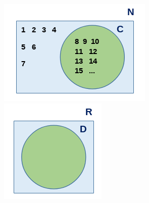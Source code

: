 \documentclass[12pt]{article}
\begin{document}
\begin{enumerate}
\begin{figure}[h!]
\begin{minipage}[b]{0.23\textwidth}
                        \end{minipage}
                        \hfill
                        \begin{minipage}[b]{0.26\textwidth}
                            \centering
                            \includegraphics[width=\textwidth]{Img/Tarea2/Tarea2_ej1_c.png}
                        \end{minipage}
                        \hfill
                        \begin{minipage}[b]{0.19\textwidth}
                            \centering
                            \includegraphics[width=\textwidth]{Img/Tarea2/Tarea2_ej1_d.png}
                        \end{minipage}
                    \end{figure}
                
            \end{enumerate}
\end{document}
